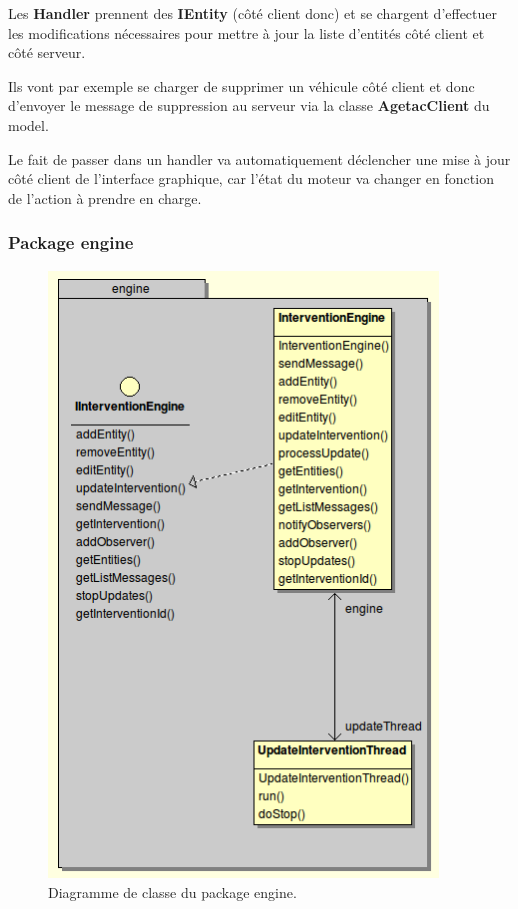 \documentclass{article}
\begin{document}
Les \textbf{Handler} prennent des \textbf{IEntity} (côté client donc) et se chargent d’effectuer les modifications nécessaires pour mettre à jour la liste d’entités côté client et côté serveur.

Ils vont par exemple se charger de supprimer un véhicule côté client et donc d’envoyer le message de suppression au serveur via la classe \textbf{AgetacClient} du model.

Le fait de passer dans un handler va automatiquement déclencher une mise à jour côté client de l’interface graphique, car l’état du moteur va changer en fonction de l’action à prendre en charge.

\newpage
\subsubsection{Package engine}
\begin{figure}[htbp]
\begin{center}
\includegraphics[width=293pt, height=456pt]{doc_dev-fig008.png}
\caption{Diagramme de classe du package engine.}
\end{center}
\end{figure}
\end{document}
